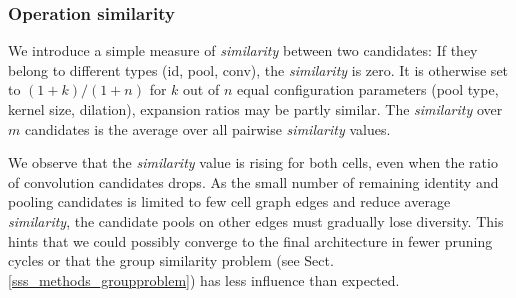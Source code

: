 \documentclass[conference]{IEEEtran}
\begin{document}
\subsubsection*{Operation similarity}
We introduce a simple measure of \textit{similarity} between two candidates: If they belong to different types (id, pool, conv), the \textit{similarity} is zero. It is otherwise set to $(1 + k) / (1 + n)$ for $k$ out of $n$ equal configuration parameters (pool type, kernel size, dilation), expansion ratios may be partly similar.
The \textit{similarity} over $m$ candidates is the average over all pairwise \textit{similarity} values.

We observe that the \textit{similarity} value is rising for both cells, even when the ratio of convolution candidates drops.
As the small number of remaining identity and pooling candidates is limited to few cell graph edges and reduce average \textit{similarity}, the candidate pools on other edges must gradually lose diversity. This hints that we could possibly converge to the final architecture in fewer pruning cycles or that the group similarity problem (see Sect. \ref{sss_methods_groupproblem}) has less influence than expected.
\end{document}
